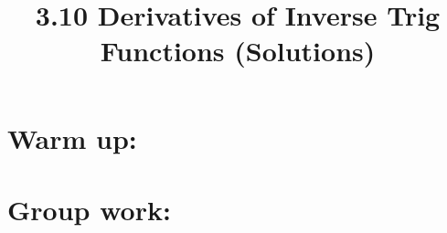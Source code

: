 \documentclass[nooutcomes]{ximera}
\title{3.10 Derivatives of Inverse Trig Functions (Solutions)}
\begin{document}
\begin{abstract}		\end{abstract}
\maketitle

\section*{Warm up:} 

		\begin{freeResponse}
		
		\end{freeResponse}	
		
		
		

	
	
	
	
	

\section*{Group work:}



\begin{problem}

		\begin{freeResponse}
		
		\end{freeResponse}
		
		
\end{problem}
















\begin{problem}

		\begin{freeResponse}
		
		\end{freeResponse}
		
		
		

\end{problem}
	
	
	
	
	
	
	
	
			
			

\begin{problem}

		\begin{freeResponse}
			
		\end{freeResponse}
			
			
		
\end{problem}
\end{document}

